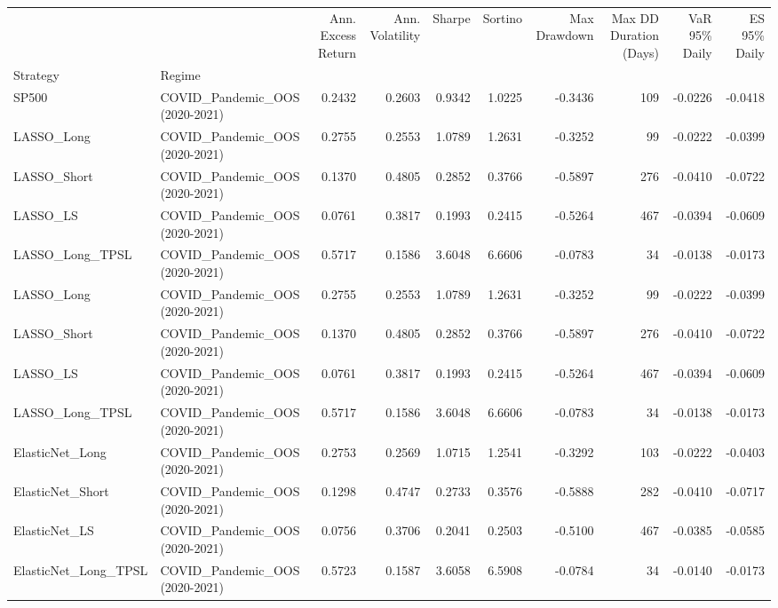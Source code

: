 \begin{tabular}{llrrrrrrrr}
\toprule
 &  & Ann. Excess Return & Ann. Volatility & Sharpe & Sortino & Max Drawdown & Max DD Duration (Days) & VaR 95\% Daily & ES 95\% Daily \\
Strategy & Regime &  &  &  &  &  &  &  &  \\
\midrule
SP500 & COVID\_Pandemic\_OOS (2020-2021) & 0.2432 & 0.2603 & 0.9342 & 1.0225 & -0.3436 & 109 & -0.0226 & -0.0418 \\
\cline{1-10}
LASSO\_Long & COVID\_Pandemic\_OOS (2020-2021) & 0.2755 & 0.2553 & 1.0789 & 1.2631 & -0.3252 & 99 & -0.0222 & -0.0399 \\
\cline{1-10}
LASSO\_Short & COVID\_Pandemic\_OOS (2020-2021) & 0.1370 & 0.4805 & 0.2852 & 0.3766 & -0.5897 & 276 & -0.0410 & -0.0722 \\
\cline{1-10}
LASSO\_LS & COVID\_Pandemic\_OOS (2020-2021) & 0.0761 & 0.3817 & 0.1993 & 0.2415 & -0.5264 & 467 & -0.0394 & -0.0609 \\
\cline{1-10}
LASSO\_Long\_TPSL & COVID\_Pandemic\_OOS (2020-2021) & 0.5717 & 0.1586 & 3.6048 & 6.6606 & -0.0783 & 34 & -0.0138 & -0.0173 \\
\cline{1-10}
LASSO\_Long & COVID\_Pandemic\_OOS (2020-2021) & 0.2755 & 0.2553 & 1.0789 & 1.2631 & -0.3252 & 99 & -0.0222 & -0.0399 \\
\cline{1-10}
LASSO\_Short & COVID\_Pandemic\_OOS (2020-2021) & 0.1370 & 0.4805 & 0.2852 & 0.3766 & -0.5897 & 276 & -0.0410 & -0.0722 \\
\cline{1-10}
LASSO\_LS & COVID\_Pandemic\_OOS (2020-2021) & 0.0761 & 0.3817 & 0.1993 & 0.2415 & -0.5264 & 467 & -0.0394 & -0.0609 \\
\cline{1-10}
LASSO\_Long\_TPSL & COVID\_Pandemic\_OOS (2020-2021) & 0.5717 & 0.1586 & 3.6048 & 6.6606 & -0.0783 & 34 & -0.0138 & -0.0173 \\
\cline{1-10}
ElasticNet\_Long & COVID\_Pandemic\_OOS (2020-2021) & 0.2753 & 0.2569 & 1.0715 & 1.2541 & -0.3292 & 103 & -0.0222 & -0.0403 \\
\cline{1-10}
ElasticNet\_Short & COVID\_Pandemic\_OOS (2020-2021) & 0.1298 & 0.4747 & 0.2733 & 0.3576 & -0.5888 & 282 & -0.0410 & -0.0717 \\
\cline{1-10}
ElasticNet\_LS & COVID\_Pandemic\_OOS (2020-2021) & 0.0756 & 0.3706 & 0.2041 & 0.2503 & -0.5100 & 467 & -0.0385 & -0.0585 \\
\cline{1-10}
ElasticNet\_Long\_TPSL & COVID\_Pandemic\_OOS (2020-2021) & 0.5723 & 0.1587 & 3.6058 & 6.5908 & -0.0784 & 34 & -0.0140 & -0.0173 \\

\end{tabular}
